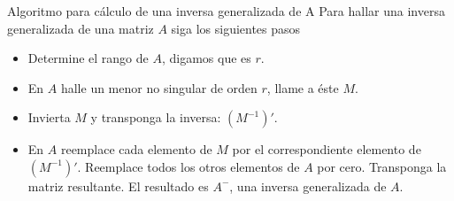 \documentclass[
  ignorenonframetext,
  aspectratio=169,
  spanish,
]{beamer}
\newenvironment{Shaded}{\begin{snugshade}}{\end{snugshade}}
\newcommand{\CommentTok}[1]{\textcolor[rgb]{0.37,0.37,0.37}{#1}}
\newcommand{\FunctionTok}[1]{\textcolor[rgb]{0.28,0.35,0.67}{#1}}
\newcommand{\NormalTok}[1]{\textcolor[rgb]{0.00,0.23,0.31}{#1}}
\newcommand{\SpecialCharTok}[1]{\textcolor[rgb]{0.37,0.37,0.37}{#1}}
\providecommand{\tightlist}{%
  \setlength{\itemsep}{0pt}\setlength{\parskip}{0pt}}
\begin{document}
\begin{frame}[fragile]{Algoritmo para cálculo de una inversa
generalizada de A}
\label{algoritmo-para-cuxe1lculo-de-una-inversa-generalizada-de-a}
Para hallar una inversa generalizada de una matriz \({A}\) siga los
siguientes pasos

\begin{itemize}
\tightlist
\item
  Determine el rango de \(A\), digamos que es \(r\).
\item
  En \({A}\) halle un menor no singular de orden \(r\), llame a éste
  \({M}\).
\item
  Invierta \({M}\) y transponga la inversa: \(\left( {M}^{-1}\right)'\).
\item
  En \({A}\) reemplace cada elemento de \({M}\) por el correspondiente
  elemento de \(\left( {M}^{-1}\right)'\). Reemplace todos los otros
  elementos de \({A}\) por cero. Transponga la matriz resultante. El
  resultado es \({A}^{-}\), una inversa generalizada de \({A}\).
\end{itemize}

\begin{Shaded}
\end{Shaded}
\end{frame}
\end{document}
